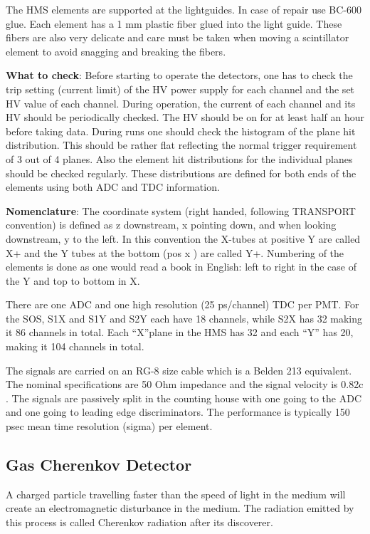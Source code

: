 {The HMS elements are supported at the lightguides. In case of repair use BC-600
glue. Each element has a 1 mm plastic fiber glued into the light guide. These
fibers are also very delicate and care must be taken when moving a scintillator
element to avoid snagging and breaking the fibers.

{\bf What to check}: Before starting to operate the detectors, one has to
check the trip setting (current limit) of the HV power supply for each channel
and the set HV value of each channel. During operation, the current of each
channel and its HV should be periodically checked. The HV should be on for at
least half an hour before taking data. During runs one should check the
histogram of the plane hit distribution. This should be rather flat reflecting
the normal trigger requirement of 3 out of 4 planes. Also the element hit
distributions for the individual planes should be checked regularly. These
distributions are defined for both ends of the elements using both ADC and TDC
information.

{\bf Nomenclature}:
The coordinate system (right handed, following TRANSPORT
convention) is defined as z downstream, x pointing down, and when looking
downstream, y to the left. In this convention the X-tubes at positive Y are
called X+ and the Y tubes at the bottom (pos x ) are called Y+. Numbering of
the elements is done as one would read a book in English: left to right in the
case of the Y and top to bottom in X.

	There are one ADC and one high resolution (25 ps/channel) TDC per PMT.
For the SOS, S1X and S1Y and S2Y each have 18 channels, while S2X has 32 making
it 86 channels in total. Each ``X''plane in the HMS has 32 and each
``Y'' has 20, making it 104 channels in total.

	The signals are carried on an RG-8 size cable which is a Belden 213
equivalent. The nominal specifications are 50 Ohm impedance and the signal
velocity is 0.82c . The signals are passively split in the counting house with
one going to the ADC and one going to leading edge discriminators. The
performance is typically 150 psec mean time resolution (sigma) per
element.

\subsection{Gas Cherenkov Detector}

A charged particle travelling faster
than the speed of light in the medium will create an electromagnetic
disturbance in the medium. The radiation emitted by this process is
called Cherenkov radiation after its discoverer.

}
